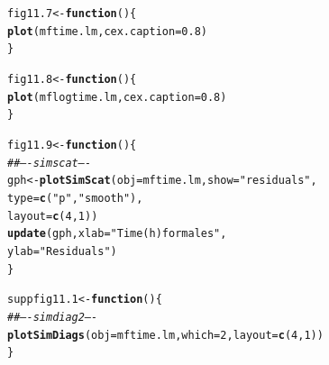 \documentclass[12pt, a4paper,  BCOR=8.25mm, DIV=15]{scrartcl}\usepackage[]{graphicx}\usepackage[]{color}
\makeatletter
\newcommand{\hlnum}[1]{\textcolor[rgb]{0.686,0.059,0.569}{#1}}%
\newcommand{\hlstr}[1]{\textcolor[rgb]{0.192,0.494,0.8}{#1}}%
\newcommand{\hlcom}[1]{\textcolor[rgb]{0.678,0.584,0.686}{\textit{#1}}}%
\newcommand{\hlstd}[1]{\textcolor[rgb]{0.345,0.345,0.345}{#1}}%
\newcommand{\hlkwa}[1]{\textcolor[rgb]{0.161,0.373,0.58}{\textbf{#1}}}%
\newcommand{\hlkwb}[1]{\textcolor[rgb]{0.69,0.353,0.396}{#1}}%
\newcommand{\hlkwc}[1]{\textcolor[rgb]{0.333,0.667,0.333}{#1}}%
\newcommand{\hlkwd}[1]{\textcolor[rgb]{0.737,0.353,0.396}{\textbf{#1}}}%
\newenvironment{kframe}{%
 \def\at@end@of@kframe{}%
 \ifinner\ifhmode%
  \def\at@end@of@kframe{\end{minipage}}%
  \begin{minipage}{\columnwidth}%
 \fi\fi%
 \def\FrameCommand##1{\hskip\@totalleftmargin \hskip-\fboxsep
 \colorbox{shadecolor}{##1}\hskip-\fboxsep
     \hskip-\linewidth \hskip-\@totalleftmargin \hskip\columnwidth}%
 \MakeFramed {\advance\hsize-\width
   \@totalleftmargin\z@ \linewidth\hsize
   \@setminipage}}%
 {\par\unskip\endMakeFramed%
 \at@end@of@kframe}
\newenvironment{knitrout}{}{} %
\makeatother
\begin{document}
\begin{knitrout}
\color{fgcolor}\begin{kframe}
\begin{alltt}
\hlstd{fig11.7} \hlkwb{<-} \hlkwa{function}\hlstd{()\{}
\hlkwd{plot}\hlstd{(mftime.lm,} \hlkwc{cex.caption}\hlstd{=}\hlnum{0.8}\hlstd{)}
\hlstd{\}}
\end{alltt}
\end{kframe}
\end{knitrout}

\begin{knitrout}
\color{fgcolor}\begin{kframe}
\begin{alltt}
\hlstd{fig11.8} \hlkwb{<-} \hlkwa{function}\hlstd{()\{}
\hlkwd{plot}\hlstd{(mflogtime.lm,} \hlkwc{cex.caption}\hlstd{=}\hlnum{0.8}\hlstd{)}
\hlstd{\}}
\end{alltt}
\end{kframe}
\end{knitrout}

\begin{knitrout}
\color{fgcolor}\begin{kframe}
\begin{alltt}
\hlstd{fig11.9} \hlkwb{<-} \hlkwa{function}\hlstd{()\{}
\hlcom{## ---- simscat ----}
\hlstd{gph} \hlkwb{<-} \hlkwd{plotSimScat}\hlstd{(}\hlkwc{obj}\hlstd{=mftime.lm,} \hlkwc{show}\hlstd{=}\hlstr{"residuals"}\hlstd{,}
                   \hlkwc{type}\hlstd{=}\hlkwd{c}\hlstd{(}\hlstr{"p"}\hlstd{,}\hlstr{"smooth"}\hlstd{),}
                   \hlkwc{layout}\hlstd{=}\hlkwd{c}\hlstd{(}\hlnum{4}\hlstd{,}\hlnum{1}\hlstd{))}
\hlkwd{update}\hlstd{(gph,} \hlkwc{xlab}\hlstd{=}\hlstr{"Time (h) for males"}\hlstd{,}
      \hlkwc{ylab}\hlstd{=}\hlstr{"Residuals"}\hlstd{)}
\hlstd{\}}
\end{alltt}
\end{kframe}
\end{knitrout}

\begin{knitrout}
\color{fgcolor}\begin{kframe}
\begin{alltt}
\hlstd{suppfig11.1} \hlkwb{<-} \hlkwa{function}\hlstd{()\{}
\hlcom{## ---- simdiag2 ----}
\hlkwd{plotSimDiags}\hlstd{(}\hlkwc{obj}\hlstd{=mftime.lm,} \hlkwc{which}\hlstd{=}\hlnum{2}\hlstd{,} \hlkwc{layout}\hlstd{=}\hlkwd{c}\hlstd{(}\hlnum{4}\hlstd{,}\hlnum{1}\hlstd{))}
\hlstd{\}}
\end{alltt}
\end{kframe}
\end{knitrout}
\end{document}
